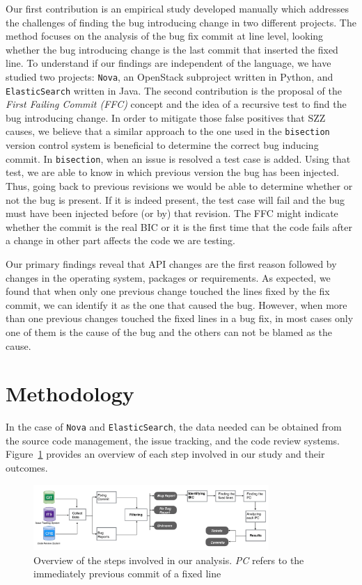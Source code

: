 \documentclass[conference]{IEEEtran}
\begin{document}
Our first contribution is an empirical study developed manually which addresses the challenges of finding the bug introducing change in two different projects.
The method focuses on the analysis of the bug fix commit at line level, looking whether the bug introducing change is the last commit that inserted the fixed line.
To understand if our findings are independent of the language, we have studied two projects: \texttt{Nova}, an OpenStack subproject written in Python, and \texttt{ElasticSearch} written in Java.
The second contribution is the proposal of the \emph{First Failing Commit (FFC)} concept and the idea of a recursive test to find the bug introducing change. 
In order to mitigate those false positives that SZZ causes, we believe that a similar approach to the one used in the \texttt{bisection} version control system is beneficial to determine the correct bug inducing commit.
In \texttt{bisection}, when an issue is resolved a test case is added.
Using that test, we are able to know in which previous version the bug has been injected.
Thus, going back to previous revisions we would be able to determine whether or not the bug is present.
If it is indeed present, the test case will fail and the bug must have been injected before (or by) that revision.
The FFC might indicate whether the commit is the real BIC or it is the first time that the code fails after a change in other part affects the code we are testing.

Our primary findings reveal that API changes are the first reason followed by changes in the operating system, packages or requirements.
As expected, we found that when only one previous change touched the lines fixed by the fix commit, we can identify it as the one that caused the bug.
However, when more than one previous changes touched the fixed lines in a bug fix, in most cases only one of them is the cause of the bug and the others can not be blamed as the cause.


\section{Methodology}
\label{sec:methodology}

In the case of \texttt{Nova} and \texttt{ElasticSearch}, the data needed can be obtained from the source code management, the issue tracking, and the code review systems. 
Figure~\ref{fig:diagram} provides an overview of each step involved in our study and their outcomes.

\begin{figure}[ht]
\centering
\includegraphics[height=2.5cm]{diagram.png}
\caption{Overview of the steps involved in our analysis. \emph{PC} refers to the immediately previous commit of a fixed line }
\label{fig:diagram}       %
\end{figure}
\end{document}
